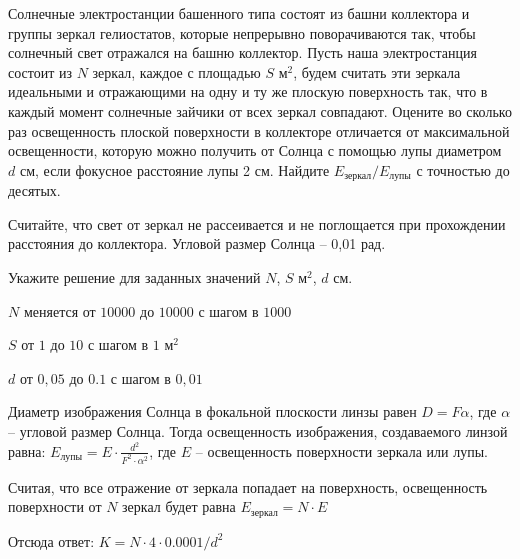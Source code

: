 
Солнечные электростанции башенного типа состоят из башни
коллектора и группы зеркал гелиостатов, которые непрерывно поворачиваются так,
чтобы солнечный свет отражался на башню коллектор. Пусть наша электростанция
состоит из $N$ зеркал, каждое с площадью $S$ м$^2$, будем считать эти зеркала идеальными и отражающими
на одну и ту же плоскую поверхность так, что в каждый момент солнечные зайчики
от всех зеркал совпадают. Оцените во сколько раз освещенность плоской
поверхности в коллекторе отличается от максимальной освещенности, которую можно
получить от Солнца с помощью лупы диаметром $d$ см, если фокусное расстояние лупы 2 см. Найдите $E_{\text{зеркал}}/E_{\text{лупы}}$ с точностью
до десятых.

Считайте, что
свет от зеркал не рассеивается и не поглощается при прохождении расстояния до
коллектора. Угловой размер Солнца – 0,01 рад.

Укажите решение для заданных значений $N$, $S$ м$^2$, $d$ см.

\paramSection

$N$ меняется от $10000$ до $10000$ с шагом в $1000$

$S$ от $1$ до $10$ с шагом в $1$ м$^2$

$d$ от $0,05$ до $0.1$ с шагом в $0,01$

\solutionSection

Диаметр изображения Солнца в фокальной плоскости линзы равен 
$D = F \alpha$, где  $\alpha$ – угловой размер Солнца. Тогда освещенность изображения, 
создаваемого линзой равна: $E_{\text{лупы}} = E \cdot \frac{d^2}{F^2 \cdot \alpha^2}$, где $E$ – освещенность 
поверхности зеркала или лупы.

Считая, что все отражение от зеркала попадает на поверхность, освещенность поверхности от $N$ зеркал будет 
равна $E_{\text{зеркал}} = N \cdot E$

Отсюда ответ:
		$K = N \cdot 4 \cdot 0.0001/d^2$


